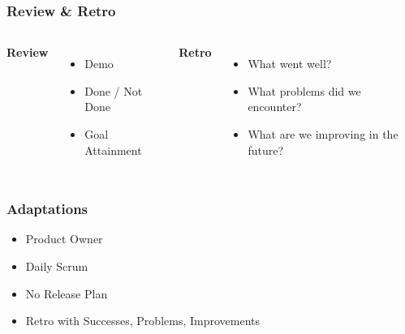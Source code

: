 \begin{frame}
    \frametitle{Review \& Retro}
    \begin{columns}
        \large
        \textbf{Review}
        \begin{itemize}
            \large
            \item Demo
            \item Done / Not Done
            \item Goal Attainment
        \end{itemize}
        \large
        \textbf{Retro}
        \begin{itemize}
            \large
            \item What went well?
            \item What problems did we encounter?
            \item What are we improving in the future?
        \end{itemize}
    \end{columns}
\end{frame}

\begin{frame}
    \frametitle{Adaptations}
    \begin{itemize}
        \large
        \item Product Owner
        \item Daily Scrum
        \item No Release Plan
        \item Retro with Successes, Problems, Improvements
    \end{itemize}
\end{frame}
